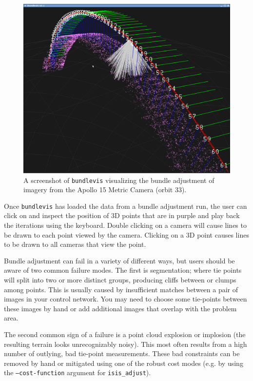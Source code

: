 \begin{figure}[b!]
  \begin{center}
  \includegraphics[width=5in]{images/bundlevis_apollo.png}
  \end{center}
  \caption{ A screenshot of \texttt{bundlevis} visualizing the bundle
    adjustment of imagery from the Apollo 15 Metric Camera (orbit
    33). }
  \label{fig:bundlevis}
\end{figure}

Once \texttt{bundlevis} has loaded the data from a bundle adjustment run,
the user can click on and inspect the position of 3D points that are
in purple and play back the iterations using the keyboard. Double
clicking on a camera will cause lines to be drawn to each point viewed
by the camera. Clicking on a 3D point causes lines to be drawn to all
cameras that view the point.

Bundle adjustment can fail in a variety of different ways, but users
should be aware of two common failure modes.  The first is segmentation;
where tie points will split into two or more distinct groups,
producing cliffs between or clumps among points. This is usually
caused by insufficient matches between a pair of images in your
control network.  You may need to choose some tie-points between
these images by hand or add additional images that overlap with the
problem area.

The second common sign of a failure is a point cloud explosion or
implosion (the resulting terrain looks unrecognizably noisy). This
most often results from a high number of outlying, bad tie-point
measurements. These bad constraints can be removed by hand or
mitigated using one of the robust cost modes (e.g. by using the
\texttt{--cost-function} argument for \texttt{isis\_adjust}).

